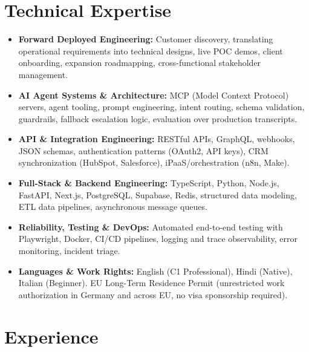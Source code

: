 \documentclass[10pt,a4paper]{article}
\begin{document}
\section{Technical Expertise}
\begin{itemize}
  \item \textbf{Forward Deployed Engineering:} Customer discovery, translating operational requirements into technical designs, live POC demos, client onboarding, expansion roadmapping, cross-functional stakeholder management.
  \item \textbf{AI Agent Systems \& Architecture:} MCP (Model Context Protocol) servers, agent tooling, prompt engineering, intent routing, schema validation, guardrails, fallback escalation logic, evaluation over production transcripts.
  \item \textbf{API \& Integration Engineering:} RESTful APIs, GraphQL, webhooks, JSON schemas, authentication patterns (OAuth2, API keys), CRM synchronization (HubSpot, Salesforce), iPaaS/orchestration (n8n, Make).
  \item \textbf{Full-Stack \& Backend Engineering:} TypeScript, Python, Node.js, FastAPI, Next.js, PostgreSQL, Supabase, Redis, structured data modeling, ETL data pipelines, asynchronous message queues.
  \item \textbf{Reliability, Testing \& DevOps:} Automated end-to-end testing with Playwright, Docker, CI/CD pipelines, logging and trace observability, error monitoring, incident triage.
  \item \textbf{Languages \& Work Rights:} English (C1 Professional), Hindi (Native), Italian (Beginner). EU Long-Term Residence Permit (unrestricted work authorization in Germany and across EU, no visa sponsorship required).
\end{itemize}

\section{Experience}
\end{document}
